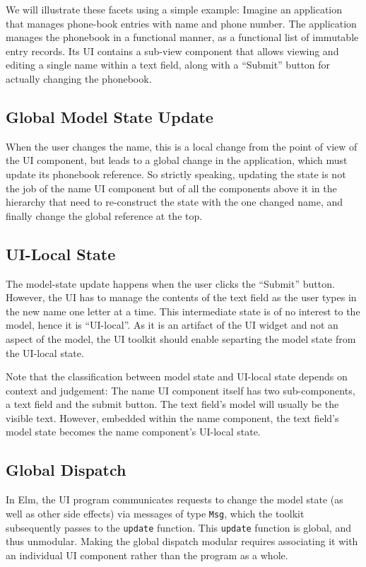 \documentclass[sigplan,review,screen]{acmart}
\begin{document}
We will illustrate these facets using a simple example: Imagine an
application that manages phone-book entries with name and phone
number.  The application manages the phonebook in a functional
manner, as a functional list of immutable entry records.  Its UI
contains a sub-view component that allows viewing and editing a single
name within a text field, along with a ``Submit'' button for actually
changing the phonebook.


\subsection{Global Model State Update}

When the user changes the name, this is a local change from the point
of view of the UI component, but leads to a global change in the
application, which must update its phonebook reference.  So strictly
speaking, updating the state is not the job of the name UI component
but of all the components above it in the hierarchy that need to
re-construct the state with the one changed name, and finally change
the global reference at the top.

\subsection{UI-Local State}

The model-state update happens when the user clicks the ``Submit''
button.  However, the UI has to manage the contents of the text field
as the user types in the new name one letter at a time.  This
intermediate state is of no interest to the model, hence it is
``UI-local''.  As it is an artifact of the UI widget and not an aspect
of the model, the UI toolkit should enable separting the model state
from the UI-local state.

Note that the classification between model state and UI-local state
depends on context and judgement: The name UI component itself has two
sub-components, a text field and the submit button.  The text field's
model will usually be the visible text.  However, embedded within the
name component, the text field's model state becomes the name
component's UI-local state.

\subsection{Global Dispatch}

In Elm, the UI program communicates requests to change the model state
(as well as other side effects) via messages of type \texttt{Msg},
which the toolkit subsequently passes to the \texttt{update} function.
This \texttt{update} function is global, and thus unmodular.  Making
the global dispatch modular requires associating it with an individual
UI component rather than the program as a whole.
\end{document}
